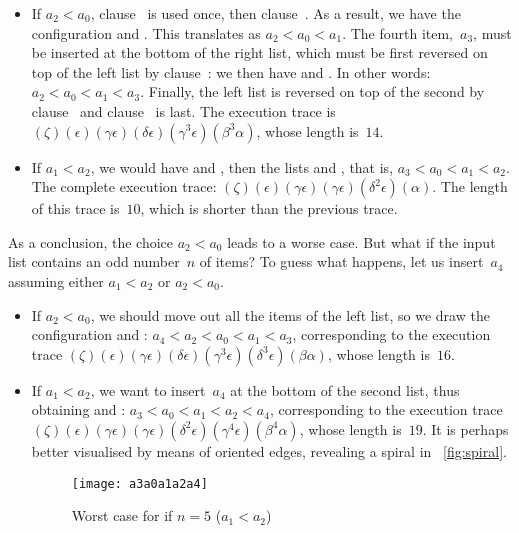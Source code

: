 \begin{itemize}

  \item If \(a_2<a_0\), clause~\clause{\delta} is used once, then
    clause~\clause{\epsilon}. As a result, we have the configuration
    \erlcode{[]} and \erlcode{[\(a_2\),\(a_0\),\(a_1\)]}. This
    translates as \(a_2< a_0< a_1\). The fourth item,~\(a_3\), must
    be inserted at the bottom of the right list, which must be first
    reversed on top of the left list by clause~\clause{\gamma}: we
    then have \erlcode{[\(a_1\),\(a_0\),\(a_2\)]} and
    \erlcode{[\(a_3\)]}. In other words: \( a_2< a_0< a_1< a_3\).
    Finally, the left list is reversed on top of the second by
    clause~\clause{\beta} and clause~\clause{\alpha} is last. The
    execution trace is
    \((\zeta)(\epsilon)(\gamma\epsilon)(\delta\epsilon)(\gamma^3\epsilon)
    (\beta^3\alpha)\), whose length is~\(14\).

  \item If \(a_1<a_2\), we would have \erlcode{[\(a_1\),\(a_0\)]}
    and \erlcode{[\(a_2\)]}, then the lists \erlcode{[]} and
    \erlcode{[\(a_3\),\(a_0\),\(a_1\),\(a_2\)]}, that is, \(a_3<
    a_0< a_1< a_2\). The complete execution trace:
    \((\zeta)(\epsilon)(\gamma\epsilon)(\gamma\epsilon)(\delta^2\epsilon)
    (\alpha)\). The length of this trace is~\(10\), which is shorter
    than the previous trace.
\end{itemize}
As a conclusion, the choice \(a_2<a_0\) leads to a worse case. But
what if the input list contains an odd number~\(n\) of items? To guess
what happens, let us insert~\(a_4\) assuming either \(a_1<a_2\) or
\(a_2<a_0\).
\begin{itemize}

  \item If \(a_2 < a_0\), we should move out all the items of the left
    list, so we draw the configuration \erlcode{[\(a_4\)]} and
    \erlcode{[\(a_2\),\(a_0\),\(a_1\),\(a_3\)]}: \(a_4< a_2< a_0< a_1<
    a_3\), corresponding to the execution trace
    \((\zeta)(\epsilon)(\gamma\epsilon)(\delta\epsilon)(\gamma^3\epsilon)
    (\delta^3\epsilon)(\beta\alpha)\), whose length is~\(16\). 

  \item If \(a_1 < a_2\), we want to insert~\(a_4\) at the bottom of
    the second list, thus obtaining
    \erlcode{[\(a_2\),\(a_1\),\(a_0\),\(a_3\)]} and
    \erlcode{[\(a_4\)]}: \(a_3 < a_0 < a_1 < a_2 < a_4\),
    corresponding to the execution trace \((\zeta)(\epsilon)
    (\gamma\epsilon)(\gamma\epsilon)(\delta^2\epsilon)(\gamma^4\epsilon)
    (\beta^4\alpha)\), whose length is~\(19\). It is
    perhaps better visualised by means of oriented edges, revealing a
    spiral in \fig~\vref{fig:spiral}.
    \begin{figure}
      \centering
      \texttt{[image: a3a0a1a2a4]}
      \caption{Worst case for  if \(n=5\) (\(a_1 < a_2\))
               \label{fig:spiral}}
    \end{figure}


\end{itemize}
